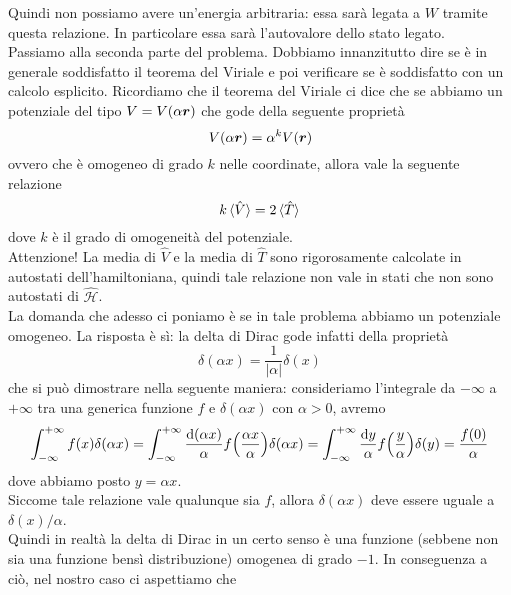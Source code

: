 \begin{soluzione}
   Quindi non possiamo avere un'energia arbitraria: essa sarà legata a $W$ tramite questa relazione. In particolare essa sarà l'autovalore dello stato legato.\\
   Passiamo alla seconda parte del problema. Dobbiamo innanzitutto dire se è in generale soddisfatto il teorema del Viriale e poi verificare se è soddisfatto con un calcolo esplicito. Ricordiamo che il teorema del Viriale ci dice che se abbiamo un potenziale del tipo $V=V(\alpha \vb*{r})$ che gode della seguente proprietà
   \begin{equation*}
      V(\alpha \vb*{r})=\alpha^k V(\vb*{r})
   \end{equation*}
   ovvero che è omogeneo di grado $k$ nelle coordinate, allora vale la seguente relazione
   \begin{equation*}
      k\expval*{\hat{V}}=2\expval*{\hat{T}}
   \end{equation*}
   dove $k$ è il grado di omogeneità del potenziale.\\
   Attenzione! La media di $\hat{V}$ e la media di $\hat{T}$ sono rigorosamente calcolate in autostati dell'hamiltoniana, quindi tale relazione non vale in stati che non sono autostati di $\hat{\mathcal{H}}$.\\
   La domanda che adesso ci poniamo è se in tale problema abbiamo un potenziale omogeneo. La risposta è sì: la delta di Dirac gode infatti della proprietà
   \begin{equation*}
      \delta(\alpha x)=\frac{1}{|\alpha|}\delta(x)
   \end{equation*}
   che si può dimostrare nella seguente maniera: consideriamo l'integrale da $-\infty$ a $+\infty$ tra una generica funzione $f$ e $\delta(\alpha x)$ con $\alpha>0$, avremo
   \begin{equation*}
      \int_{-\infty}^{+\infty} f(x)\delta(\alpha x)
      =\int_{-\infty}^{+\infty} \frac{\dd{(\alpha x)}}{\alpha} f\qty( \frac{\alpha x}{\alpha} )\delta(\alpha x)
      =\int_{-\infty}^{+\infty} \frac{\dd{y}}{\alpha} f\qty( \frac{y}{\alpha} ) \delta(y)
      =\frac{f(0)}{\alpha}
   \end{equation*}
   dove abbiamo posto $y=\alpha x$.\\
   Siccome tale relazione vale qualunque sia $f$, allora $\delta(\alpha x)$ deve essere uguale a $\delta(x)/\alpha$.\\
   Quindi in realtà la delta di Dirac in un certo senso è una funzione (sebbene non sia una funzione bensì distribuzione) omogenea di grado $-1$. In conseguenza a ciò, nel nostro caso ci aspettiamo che

\end{soluzione}

